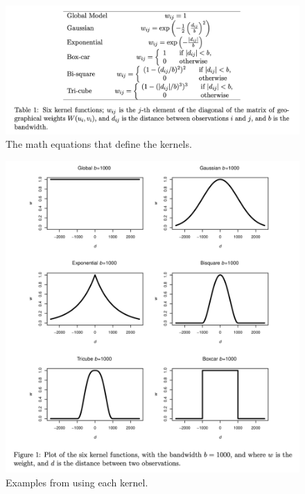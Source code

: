 \documentclass[
]{book}
\begin{document}
\begin{figure}

{\centering \includegraphics[width=1\linewidth]{images/gwmodel_kernel_math} 

}

\caption{The math equations that define the kernels.}\label{fig:GWmodelFig1}
\end{figure}

\begin{figure}

{\centering \includegraphics[width=1\linewidth]{images/gwmodel_kernel_graphs} 

}

\caption{Examples from using each kernel.}\label{fig:GWmodelFig2}
\end{figure}
\end{document}
